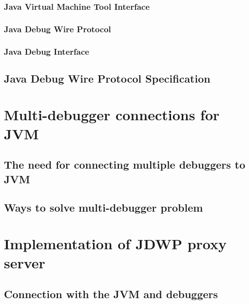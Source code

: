 \documentclass{style/bachelor-thesis}
\begin{document}
\subsubsection{Java Virtual Machine Tool Interface}
\label{sec:jvmti}


\subsubsection{Java Debug Wire Protocol}
\label{sec:jdwp}


\subsubsection{Java Debug Interface}
\label{sec:jdi}


\subsection{Java Debug Wire Protocol Specification}
\label{sec:jdwp_spec}



\pagebreak

\section{Multi-debugger connections for JVM}
\label{sec:proxy}


\subsection{The need for connecting multiple debuggers to JVM}
\label{sec:need_for_proxy}


\subsection{Ways to solve multi-debugger problem}
\label{sec:proxy_solutions}


\pagebreak

\section{Implementation of JDWP proxy server}
\label{sec:implementation}


\subsection{Connection with the JVM and debuggers}
\label{sec:impl_connection}

\end{document}
